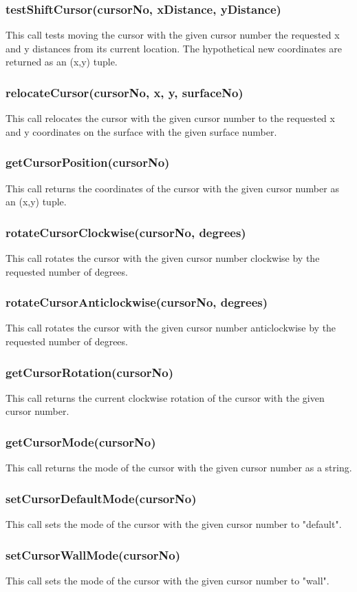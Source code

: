 \documentclass{acm_proc_article-sp}
\begin{document}
\subsubsection{testShiftCursor(cursorNo, xDistance, yDistance)}
This call tests moving the cursor with the given cursor number the requested x and y distances from its current location. The hypothetical new coordinates are returned as an (x,y) tuple.
\subsubsection{relocateCursor(cursorNo, x, y, surfaceNo)}
This call relocates the cursor with the given cursor number to the requested x and y coordinates on the surface with the given surface number.
\subsubsection{getCursorPosition(cursorNo)}
This call returns the coordinates of the cursor with the given cursor number as an (x,y) tuple.
\subsubsection{rotateCursorClockwise(cursorNo, degrees)}
This call rotates the cursor with the given cursor number clockwise by the requested number of degrees.
\subsubsection{rotateCursorAnticlockwise(cursorNo, degrees)}
This call rotates the cursor with the given cursor number anticlockwise by the requested number of degrees.
\subsubsection{getCursorRotation(cursorNo)}
This call returns the current clockwise rotation of the cursor with the given cursor number.
\subsubsection{getCursorMode(cursorNo)}
This call returns the mode of the cursor with the given cursor number as a string.
\subsubsection{setCursorDefaultMode(cursorNo)}
This call sets the mode of the cursor with the given cursor number to "default".
\subsubsection{setCursorWallMode(cursorNo)}
This call sets the mode of the cursor with the given cursor number to "wall".
\end{document}
